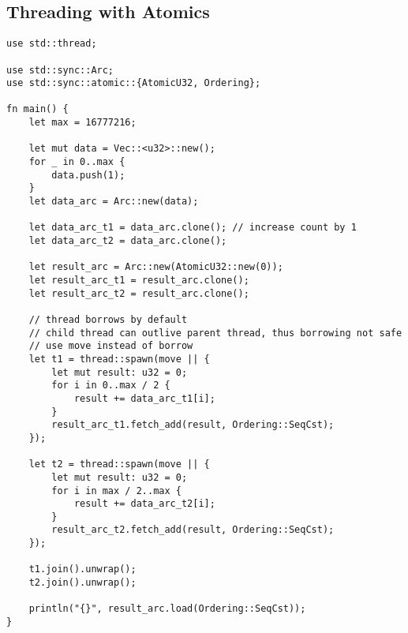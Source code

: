 \documentclass[twocolumn,landscape,10pt]{article}
\theoremstyle{definition}
\begin{document}
\subsection{Threading with Atomics}
\begin{lstlisting}[Rust]
use std::thread;

use std::sync::Arc;
use std::sync::atomic::{AtomicU32, Ordering};

fn main() {
    let max = 16777216;
    
    let mut data = Vec::<u32>::new();
    for _ in 0..max {
        data.push(1);
    }
    let data_arc = Arc::new(data);

    let data_arc_t1 = data_arc.clone(); // increase count by 1
    let data_arc_t2 = data_arc.clone();

    let result_arc = Arc::new(AtomicU32::new(0));
    let result_arc_t1 = result_arc.clone();
    let result_arc_t2 = result_arc.clone();

    // thread borrows by default
    // child thread can outlive parent thread, thus borrowing not safe
    // use move instead of borrow
    let t1 = thread::spawn(move || {
        let mut result: u32 = 0;
        for i in 0..max / 2 {
            result += data_arc_t1[i];
        }
        result_arc_t1.fetch_add(result, Ordering::SeqCst);
    });

    let t2 = thread::spawn(move || {
        let mut result: u32 = 0;
        for i in max / 2..max {
            result += data_arc_t2[i];
        }
        result_arc_t2.fetch_add(result, Ordering::SeqCst);
    });

    t1.join().unwrap();
    t2.join().unwrap();

    println("{}", result_arc.load(Ordering::SeqCst));
}
\end{lstlisting}
\end{document}

